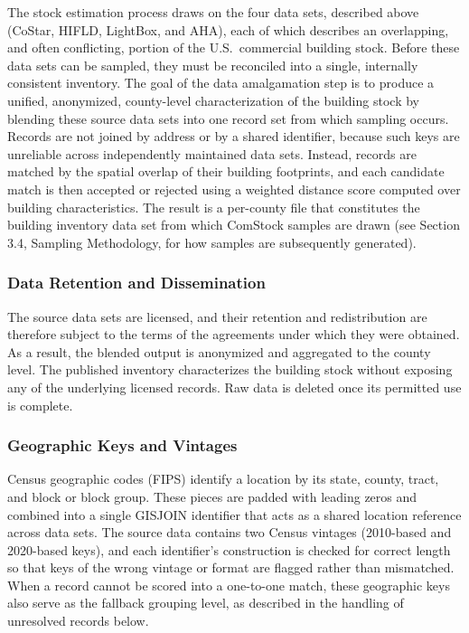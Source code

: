 The stock estimation process draws on the four data sets, described above (CoStar, HIFLD, LightBox, and AHA), each of which describes an overlapping, and often conflicting, portion of the U.S.\ commercial building stock. Before these data sets can be sampled, they must be reconciled into a single, internally consistent inventory. The goal of the data amalgamation step is to produce a unified, anonymized, county-level characterization of the building stock by blending these source data sets into one record set from which sampling occurs. Records are not joined by address or by a shared identifier, because such keys are unreliable across independently maintained data sets. Instead, records are matched by the spatial overlap of their building footprints, and each candidate match is then accepted or rejected using a weighted distance score computed over building characteristics. The result is a per-county file that constitutes the building inventory data set from which ComStock samples are drawn (see Section 3.4, Sampling Methodology, for how samples are subsequently generated).

\subsubsection{Data Retention and Dissemination} \label{sec:data-retention}

The source data sets are licensed, and their retention and redistribution are therefore subject to the terms of the agreements under which they were obtained. As a result, the blended output is anonymized and aggregated to the county level. The published inventory characterizes the building stock without exposing any of the underlying licensed records. Raw data is deleted once its permitted use is complete.

\subsubsection{Geographic Keys and Vintages}
\label{sec:geographic-keys}

Census geographic codes (FIPS) identify a location by its state, county, tract, and block or block group. These pieces are padded with leading zeros and combined into a single GISJOIN identifier that acts as a shared location reference across data sets. The source data contains two Census vintages (2010-based and 2020-based keys), and each identifier's construction is checked for correct length so that keys of the wrong vintage or format are flagged rather than mismatched. When a record cannot be scored into a one-to-one match, these geographic keys also serve as the fallback grouping level, as described in the handling of unresolved records below.

